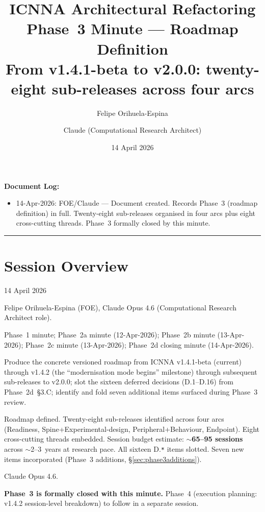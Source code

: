 \documentclass[11pt,a4paper]{article}
\title{ICNNA Architectural Refactoring\\Phase~3 Minute --- Roadmap Definition\\
\large From v1.4.1-beta to v2.0.0: twenty-eight sub-releases across four arcs}
\author{Felipe Orihuela-Espina \and Claude (Computational Research Architect)}
\date{14 April 2026}
\begin{document}
\maketitle

\noindent\textbf{Document Log:}
\begin{itemize}[nosep]
    \item 14-Apr-2026: FOE/Claude --- Document created. Records Phase~3 (roadmap definition) in full. Twenty-eight sub-releases organised in four arcs plus eight cross-cutting threads. Phase~3 formally closed by this minute.
\end{itemize}

\vspace{1em}
\hrule
\vspace{1em}

\section{Session Overview}

\begin{description}[style=nextline]
    \item[Date:] 14 April 2026
    \item[Participants:] Felipe Orihuela-Espina (FOE), Claude Opus 4.6 (Computational Research Architect role).
    \item[Predecessors:] Phase~1 minute; Phase~2a minute (12-Apr-2026); Phase~2b minute (13-Apr-2026); Phase~2c minute (13-Apr-2026); Phase~2d closing minute (14-Apr-2026).
    \item[Objective:] Produce the concrete versioned roadmap from ICNNA v1.4.1-beta (current) through v1.4.2 (the ``modernisation mode begins'' milestone) through subsequent sub-releases to v2.0.0; slot the sixteen deferred decisions (D.1--D.16) from Phase~2d~\S3.C; identify and fold seven additional items surfaced during Phase~3 review.
    \item[Outcome:] Roadmap defined. Twenty-eight sub-releases identified across four arcs (Readiness, Spine+Experimental-design, Peripheral+Behaviour, Endpoint). Eight cross-cutting threads embedded. Session budget estimate: \textbf{$\sim$65--95 sessions} across $\sim$2--3~years at research pace. All sixteen D.\texttt{*} items slotted. Seven new items incorporated (Phase~3 additions, \S\ref{sec:phase3additions}).
    \item[Model used:] Claude Opus 4.6.
    \item[Status:] \textbf{Phase~3 is formally closed with this minute.} Phase~4 (execution planning: v1.4.2 session-level breakdown) to follow in a separate session.
\end{description}
\end{document}
